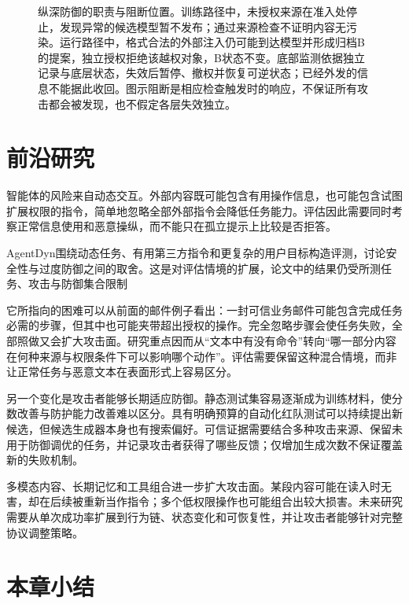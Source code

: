 \begin{figure}[htbp]
  \centering
  
  \caption{纵深防御的职责与阻断位置。训练路径中，未授权来源在准入处停止，发现异常的候选模型暂不发布；通过来源检查不证明内容无污染。运行路径中，格式合法的外部注入仍可能到达模型并形成归档B的提案，独立授权拒绝该越权对象，B状态不变。底部监测依据独立记录与底层状态，失效后暂停、撤权并恢复可逆状态；已经外发的信息不能据此收回。图示阻断是相应检查触发时的响应，不保证所有攻击都会被发现，也不假定各层失效独立。}
  \label{fig:trust-defense-in-depth}
\end{figure}

\FloatBarrier
\section{前沿研究}
\label{sec:security-frontiers}

智能体的风险来自动态交互。外部内容既可能包含有用操作信息，也可能包含试图扩展权限的指令，简单地忽略全部外部指令会降低任务能力。评估因此需要同时考察正常信息使用和恶意操纵，而不能只在孤立提示上比较是否拒答。

AgentDyn围绕动态任务、有用第三方指令和更复杂的用户目标构造评测，讨论安全性与过度防御之间的取舍。这是对评估情境的扩展，论文中的结果仍受所测任务、攻击与防御集合限制

它所指向的困难可以从前面的邮件例子看出：一封可信业务邮件可能包含完成任务必需的步骤，但其中也可能夹带超出授权的操作。完全忽略步骤会使任务失败，全部照做又会扩大攻击面。研究重点因而从“文本中有没有命令”转向“哪一部分内容在何种来源与权限条件下可以影响哪个动作”。评估需要保留这种混合情境，而非让正常任务与恶意文本在表面形式上容易区分。

另一个变化是攻击者能够长期适应防御。静态测试集容易逐渐成为训练材料，使分数改善与防护能力改善难以区分。具有明确预算的自动化红队测试可以持续提出新候选，但候选生成器本身也有搜索偏好。可信证据需要结合多种攻击来源、保留未用于防御调优的任务，并记录攻击者获得了哪些反馈；仅增加生成次数不保证覆盖新的失败机制。

多模态内容、长期记忆和工具组合进一步扩大攻击面。某段内容可能在读入时无害，却在后续被重新当作指令；多个低权限操作也可能组合出较大损害。未来研究需要从单次成功率扩展到行为链、状态变化和可恢复性，并让攻击者能够针对完整协议调整策略。

\section{本章小结}
\label{sec:security-summary}

